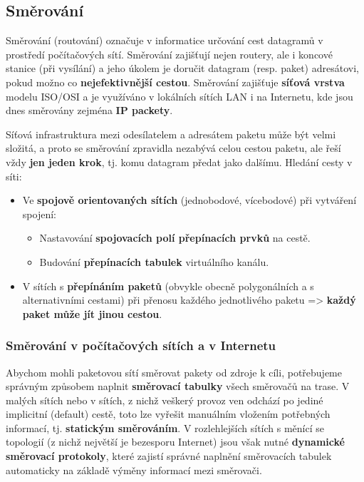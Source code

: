 \subsection{Směrování} 
Směrování (routování) označuje v informatice určování cest datagramů v prostředí počítačových sítí. Směrování zajišťují nejen routery, ale i koncové stanice (při vysílání) a jeho úkolem je doručit datagram (resp. paket) adresátovi, pokud možno co \textbf{nejefektivnější cestou}. Směrování zajišťuje \textbf{síťová vrstva} modelu ISO/OSI a je využíváno v lokálních sítích LAN i na Internetu, kde jsou dnes směrovány zejména \textbf{IP packety}.

Síťová infrastruktura mezi odesílatelem a adresátem paketu může být velmi složitá, a proto se směrování zpravidla nezabývá celou cestou paketu, ale řeší vždy \textbf{jen jeden krok}, tj. komu datagram předat jako dalšímu. Hledání cesty v síti:

\begin{itemize}
	\item Ve \textbf{spojově orientovaných sítích} (jednobodové, vícebodové) při vytváření spojení:
	\begin{itemize}
		\item Nastavování \textbf{spojovacích polí přepínacích prvků} na cestě.
		\item Budování \textbf{přepínacích tabulek} virtuálního kanálu.
	\end{itemize}
	\item V sítích s \textbf{přepínáním paketů} (obvykle obecně polygonálních a s alternativními cestami) při přenosu každého jednotlivého paketu => \textbf{každý paket může jít jinou cestou}.
\end{itemize}

\subsubsection{Směrování v počítačových sítích a v Internetu}
Abychom mohli paketovou sítí směrovat pakety od zdroje k cíli, potřebujeme správným způsobem naplnit \textbf{směrovací tabulky} všech směrovačů na trase. V malých sítích nebo v sítích, z nichž veškerý provoz ven odchází po jediné implicitní (default) cestě, toto lze vyřešit manuálním vložením potřebných informací, tj. \textbf{statickým směrováním}. V rozlehlejších sítích s měnící se topologií (z nichž největší je bezesporu Internet) jsou však nutné \textbf{dynamické směrovací protokoly}, které zajistí správné naplnění směrovacích tabulek automaticky na základě výměny informací mezi směrovači.

